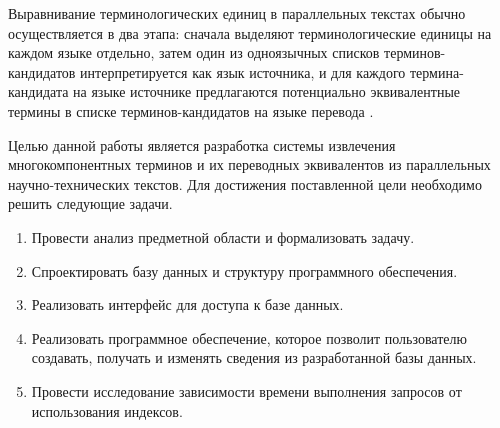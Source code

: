 Выравнивание терминологических единиц в параллельных текстах обычно осуществляется в два этапа: сначала выделяют терминологические единицы на каждом языке отдельно, затем один из одноязычных списков терминов-кандидатов интерпретируется как язык источника, и для каждого термина-кандидата на языке источнике предлагаются потенциально эквивалентные термины в списке терминов-кандидатов на языке перевода \cite{intro_10}.

Целью данной работы является разработка системы извлечения многокомпонентных терминов и их переводных эквивалентов из параллельных научно-технических текстов. Для достижения поставленной цели необходимо решить следующие задачи.

\begin{enumerate}[label*=\arabic*.]
	\item Провести анализ предметной области и формализовать задачу.
	\item Спроектировать базу данных и структуру программного обеспечения.
	\item Реализовать интерфейс для доступа к базе данных. 
	\item Реализовать программное обеспечение, которое позволит пользователю создавать, получать и изменять сведения из разработанной базы данных. 
	\item Провести исследование зависимости времени выполнения запросов от использования индексов.
\end{enumerate}

\pagebreak